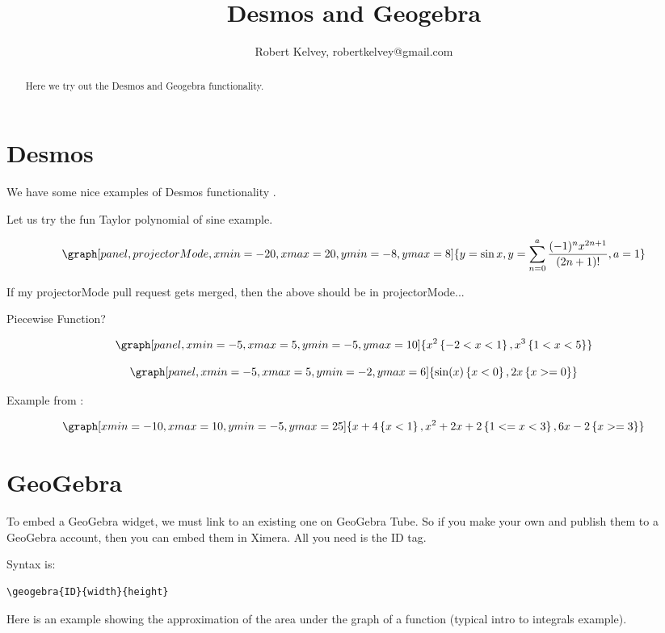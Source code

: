 \documentclass{ximera}
\title{Desmos and Geogebra}
\author{Robert Kelvey, robertkelvey@gmail.com}
\begin{document}
\begin{abstract}
Here we try out the Desmos and Geogebra functionality.
\end{abstract}
\maketitle

\section{Desmos}

We have some nice examples of Desmos functionality . 

Let us try the fun Taylor polynomial of sine example.

\[
    \graph[panel,projectorMode,xmin=-20,xmax=20,ymin=-8,ymax=8]{y=\sin x, y=\sum _{n=0}^a\frac{(-1)^n x^{2n+1}}{(2n+1)!}, a=1}
\]

If my projectorMode pull request gets merged, then the above should be in projectorMode...

Piecewise Function?

\[
    \graph[panel,xmin=-5, xmax=5, ymin=-5, ymax=10]{ x^2\left\{-2 < x < 1 \right\}, x^3 \left\{1<x<5\right\}}
\]

\[
    \graph[panel,xmin=-5, xmax=5, ymin=-2, ymax=6]{ \sin(x)\left\{x<0\right\}, 2x\left\{ x>=0 \right\} }
\]

Example from :

\[
       \graph[xmin=-10, xmax=10, ymin=-5, ymax=25]{ x+4\left\{x<1\right\}, x^2+2x+2\left\{1<= x < 3\right\}, 6x-2\left\{x>=3\right\} }
\]


\section{GeoGebra}

To embed a GeoGebra widget, we must link to an existing one on GeoGebra Tube. So if you make your own and publish them to a GeoGebra account, then you can embed them in Ximera. All you need is the ID tag.

Syntax is: \begin{verbatim}\geogebra{ID}{width}{height} \end{verbatim}

Here is an example showing the approximation of the area under the graph of a function (typical intro to integrals example).

\end{document}
